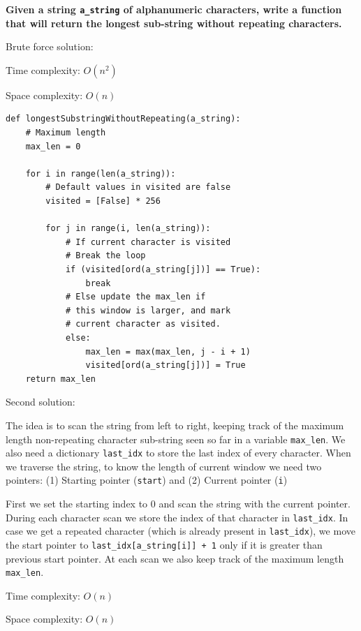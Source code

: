 \documentclass[a4paper,11pt]{book}
\begin{document}
\noindent \textbf{Given a string \lstinline{a_string} of alphanumeric characters, write a function that will return the longest sub-string without repeating characters.}
\vspace{5mm}

\noindent Brute force solution:

\noindent Time complexity: $O(n^2)$

\noindent Space complexity: $O(n)$

\begin{lstlisting}
def longestSubstringWithoutRepeating(a_string):    
    # Maximum length
    max_len = 0
  
    for i in range(len(a_string)):
        # Default values in visited are false
        visited = [False] * 256  
  
        for j in range(i, len(a_string)):
            # If current character is visited
            # Break the loop
            if (visited[ord(a_string[j])] == True):
                break
            # Else update the max_len if
            # this window is larger, and mark
            # current character as visited.
            else:
                max_len = max(max_len, j - i + 1)
                visited[ord(a_string[j])] = True
    return max_len
\end{lstlisting}

\noindent Second solution: 

The idea is to scan the string from left to right, keeping track of the maximum length non-repeating character sub-string seen so far in a variable \lstinline{max_len}. We also need a dictionary \lstinline{last_idx} to store the last index of every character. When we traverse the string, to know the length of current window we need two pointers: (1) Starting pointer (\lstinline{start}) and (2) Current pointer (\lstinline{i})

First we set the starting index to 0 and scan the string with the current pointer. During each character scan we store the index of that character in \lstinline{last_idx}. In case we get a repeated character (which is already present in \lstinline{last_idx}), we move the start pointer to \lstinline{last_idx[a_string[i]] + 1} only if it is greater than previous start pointer. At each scan we also keep track of the maximum length \lstinline{max_len}.

\noindent Time complexity: $O(n)$

\noindent Space complexity: $O(n)$
\end{document}
